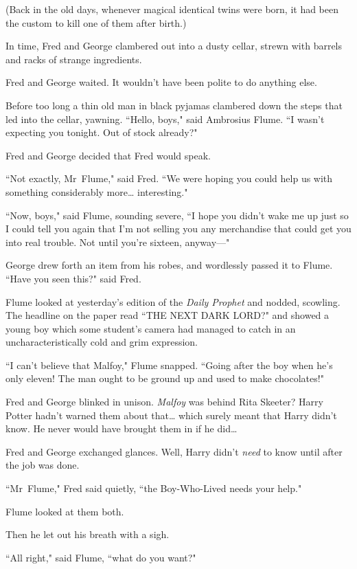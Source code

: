 (Back in the old days, whenever magical identical twins were born, it had been the custom to kill one of them after birth.)

In time, Fred and George clambered out into a dusty cellar, strewn with barrels and racks of strange ingredients.

Fred and George waited. It wouldn't have been polite to do anything else.

Before too long a thin old man in black pyjamas clambered down the steps that led into the cellar, yawning. ``Hello, boys," said Ambrosius Flume. ``I wasn't expecting you tonight. Out of stock already?"

Fred and George decided that Fred would speak.

``Not exactly, Mr~Flume," said Fred. ``We were hoping you could help us with something considerably more{\ldots} interesting."

``Now, boys," said Flume, sounding severe, ``I hope you didn't wake me up just so I could tell you again that I'm not selling you any merchandise that could get you into real trouble. Not until you're sixteen, anyway—"

George drew forth an item from his robes, and wordlessly passed it to Flume. ``Have you seen this?" said Fred.

Flume looked at yesterday's edition of the \emph{Daily Prophet} and nodded, scowling. The headline on the paper read ``THE NEXT DARK LORD?" and showed a young boy which some student's camera had managed to catch in an uncharacteristically cold and grim expression.

``I can't believe that Malfoy," Flume snapped. ``Going after the boy when he's only eleven! The man ought to be ground up and used to make chocolates!"

Fred and George blinked in unison. \emph{Malfoy} was behind Rita Skeeter? Harry Potter hadn't warned them about that{\ldots} which surely meant that Harry didn't know. He never would have brought them in if he did{\ldots}

Fred and George exchanged glances. Well, Harry didn't \emph{need} to know until after the job was done.

``Mr~Flume," Fred said quietly, ``the Boy-Who-Lived needs your help."

Flume looked at them both.

Then he let out his breath with a sigh.

``All right," said Flume, ``what do you want?"

